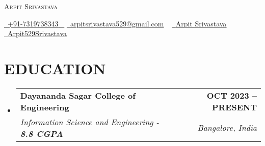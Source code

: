 \documentclass[letterpaper,11pt]{article}
\makeatletter
\newcommand{\resumeSubheading}[4]{
  \vspace{-2pt}\item
    \begin{tabular*}{1.0\textwidth}[t]{l@{\extracolsep{\fill}}r}
      \textbf{\large#1} & \textbf{\small #2} \\
      \textit{\large#3} & \textit{\small #4} \\
      
    \end{tabular*}\vspace{-7pt}
}
\newcommand{\resumeSubHeadingListStart}{\begin{itemize}[leftmargin=0.0in, label={}]}
\newcommand{\resumeSubHeadingListEnd}{\end{itemize}}
\makeatother
\begin{document}


\begin{center}
    {\Huge \scshape Arpit Srivastava} \\ \vspace{1pt}
   
    \small \href{tel:+xxxxxxxxxxxx}{ \raisebox{-0.1\height}\faPhone\ \underline{+91-7319738343} ~} 
    \href{mailto:arpitsrivastava529@gmail.com}{\raisebox{-0.2\height}\faEnvelope\  \underline{arpitsrivastava529@gmail.com}} ~ 
    \href{https://www.linkedin.com/in/arpitsrivastava529/}{\raisebox{-0.2\height}\faLinkedinSquare\ \underline{Arpit Srivastava}} 
    \hspace{10pt} %
    \href{https://github.com/arpit529srivastava}{\raisebox{-0.2\height}\faGithubSquare\ \underline{Arpit529Srivastava}}
\end{center}

\section{EDUCATION}
  \resumeSubHeadingListStart
    \resumeSubheading
      {Dayananda Sagar College of Engineering}{OCT 2023 -- PRESENT}
      {Information Science and Engineering -  \textbf{8.8 CGPA}}{Bangalore, India}
      \vspace{-2pt}
  \resumeSubHeadingListEnd

  


        
               

%
\end{document}
